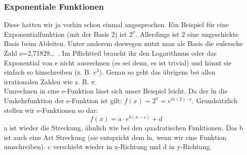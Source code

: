 
	\subsubsection{Exponentiale Funktionen}
Diese hatten wir ja vorhin schon einmal angesprochen. Ein Beispiel für eine Exponentialfunktion (mit der Basis 2) ist \(2^x\). Allerdings ist 2 eine ungeschickte Basis beim Ableiten. Unter anderem deswegen nutzt man als Basis die eulersche Zahl e=2,71828\ldots \ . Im Pflichtteil braucht ihr den Logarithmus oder das Exponential von e nicht ausrechnen (es sei denn, es ist trivial) und könnt sie einfach so hinschreiben (z. B. \(e^3\)). Genau so geht das übrigens bei allen irrationalen Zahlen wie z. B. \(\pi\).\\
Umrechnen in eine e-Funktion lässt sich unser Beispiel leicht. Da der ln die Umkehrfunktion der e-Funktion ist gilt: \(f(x)=2^x=e^{ln(2)\cdot x}\). Grundsätzlich stellen wir e-Funktionen so dar:
\[f(x)=a \cdot e^{b(x-c)}+d\]
a ist wieder die Streckung, ähnlich wie bei den quadratischen Funktionen. Das b ist auch eine Art Streckung (sie entspricht dem ln, wenn wir eine Funktion umschreiben). c verschiebt wieder in x-Richtung und d in y-Richtung.\\

